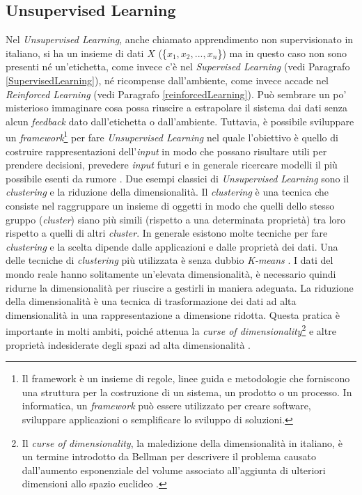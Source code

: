 \documentclass[12pt,italian]{report}
\begin{document}
	\subsection{Unsupervised Learning}
	Nel \textit{Unsupervised Learning}, anche chiamato apprendimento non supervisionato in italiano, si ha un insieme di dati $X$ (\{$x_1, x_2,...,x_n$\}) ma in questo caso non sono presenti né un'etichetta, come invece c'è nel \textit{Supervised Learning} (vedi Paragrafo  \ref{SupervisedLearning}), né ricompense dall'ambiente, come invece accade nel \textit{Reinforced Learning} (vedi Paragrafo \ref{reinforcedLearning}). Può sembrare un po' misterioso immaginare cosa possa riuscire a estrapolare il sistema dai dati senza alcun \textit{feedback} dato dall'etichetta o dall'ambiente. Tuttavia, è possibile sviluppare un \textit{framework}\footnote{Il framework è un insieme di regole, linee guida e metodologie che forniscono una struttura per la costruzione di un sistema, un prodotto o un processo. In informatica, un \textit{framework} può essere utilizzato per creare software, sviluppare applicazioni o semplificare lo sviluppo di soluzioni.} per fare \textit{Unsupervised Learning} nel quale l'obiettivo è quello di costruire rappresentazioni dell'\textit{input} in modo che possano risultare utili per prendere decisioni, prevedere \textit{input} futuri e in generale ricercare modelli il più possibile esenti da rumore \cite{Ghahramani2004}.
	Due esempi classici di \textit{Unsupervised Learning} sono il \textit{clustering} e la riduzione della dimensionalità.
	Il \textit{clustering} è una tecnica che consiste nel raggruppare un insieme di oggetti in modo che quelli dello stesso gruppo (\textit{cluster}) siano più simili (rispetto a una determinata proprietà) tra loro rispetto a quelli di altri \textit{cluster}. In generale esistono molte tecniche per fare \textit{clustering} e la scelta dipende dalle applicazioni e dalle proprietà dei dati. Una delle tecniche di \textit{clustering} più utilizzata è senza dubbio \textit{K-means} \cite{morissette2013k}.
	I dati del mondo reale hanno solitamente un'elevata dimensionalità, è necessario quindi ridurne la dimensionalità per riuscire a gestirli in maniera adeguata. La riduzione della dimensionalità è una tecnica di trasformazione dei dati ad alta dimensionalità in una rappresentazione a dimensione ridotta. Questa pratica è importante in molti ambiti, poiché attenua la \textit{curse of dimensionality}\footnote{Il \textit{curse of dimensionality}, la maledizione della dimensionalità in italiano, è un termine introdotto da Bellman per descrivere il problema causato dall'aumento esponenziale del volume associato all'aggiunta di ulteriori dimensioni allo spazio euclideo \cite{Keogh2017}.} e altre proprietà indesiderate degli spazi ad alta dimensionalità \cite{Jimenez1998SupervisedCI}.
\end{document}
